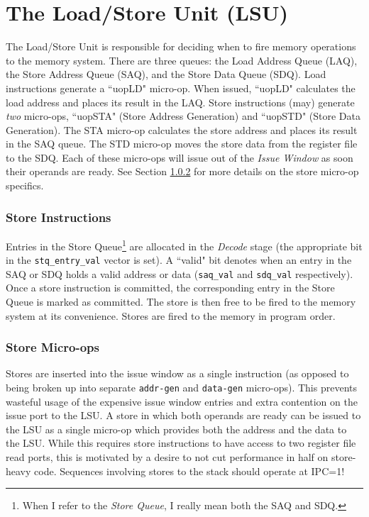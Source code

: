 
\chapter{The Load/Store Unit (LSU)}\label{sec:lsu}

The Load/Store Unit is responsible for deciding when to fire memory operations to the memory system.  There are three queues: the Load Address Queue (LAQ), the Store Address Queue (SAQ), and the Store Data Queue (SDQ).  Load instructions generate a ``uopLD" micro-op.  When issued, ``uopLD" calculates the load address and places its result in the LAQ.  Store instructions (may) generate {\em two} micro-ops,  ``uopSTA" (Store Address Generation) and ``uopSTD" (Store Data Generation).  The STA micro-op calculates the store address and places its result in the SAQ queue.  The STD micro-op moves the store data from the register file to the SDQ.  Each of these micro-ops will issue out of the {\em Issue Window} as soon their operands are ready.  See Section \ref{sec:storeuops} for more details on the store micro-op specifics. 

\subsection{Store Instructions}

Entries in the Store Queue\footnote{When I refer to the {\em Store Queue}, I really mean both the SAQ and SDQ.} are allocated in the {\em Decode} stage (the appropriate bit in the {\tt stq\_entry\_val} vector is set).  A ``valid" bit denotes when an entry in the SAQ or SDQ holds a valid address or data ({\tt saq\_val} and {\tt sdq\_val} respectively).  Once a store instruction is committed, the corresponding entry in the Store Queue is marked as committed.  The store is then free to be fired to the memory system at its convenience.  Stores are fired to the memory in program order.


\subsection{Store Micro-ops}\label{sec:storeuops}

Stores are inserted into the issue window as a single instruction (as opposed to being broken up into separate {\tt addr-gen} and {\tt data-gen} micro-ops). This prevents wasteful usage of the expensive issue window entries and extra contention on the issue port to the LSU.  A store in which both operands are ready can be issued to the LSU as a single micro-op which provides both the address and the data to the LSU.  While this requires store instructions to have access to two register file read ports, this is motivated by a desire to not cut performance in half on store-heavy code.  Sequences involving stores to the stack should operate at IPC=1!

